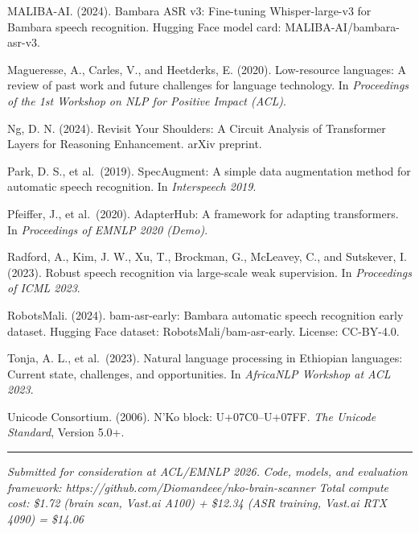 \documentclass[
]{article}
\begin{document}
MALIBA-AI. (2024). Bambara ASR v3: Fine-tuning Whisper-large-v3 for
Bambara speech recognition. Hugging Face model card:
MALIBA-AI/bambara-asr-v3.

Magueresse, A., Carles, V., and Heetderks, E. (2020). Low-resource
languages: A review of past work and future challenges for language
technology. In \emph{Proceedings of the 1st Workshop on NLP for Positive
Impact (ACL)}.

Ng, D. N. (2024). Revisit Your Shoulders: A Circuit Analysis of
Transformer Layers for Reasoning Enhancement. arXiv preprint.

Park, D. S., et al.~(2019). SpecAugment: A simple data augmentation
method for automatic speech recognition. In \emph{Interspeech 2019}.

Pfeiffer, J., et al.~(2020). AdapterHub: A framework for adapting
transformers. In \emph{Proceedings of EMNLP 2020 (Demo)}.

Radford, A., Kim, J. W., Xu, T., Brockman, G., McLeavey, C., and
Sutskever, I. (2023). Robust speech recognition via large-scale weak
supervision. In \emph{Proceedings of ICML 2023}.

RobotsMali. (2024). bam-asr-early: Bambara automatic speech recognition
early dataset. Hugging Face dataset: RobotsMali/bam-asr-early. License:
CC-BY-4.0.

Tonja, A. L., et al.~(2023). Natural language processing in Ethiopian
languages: Current state, challenges, and opportunities. In
\emph{AfricaNLP Workshop at ACL 2023}.

Unicode Consortium. (2006). N'Ko block: U+07C0--U+07FF. \emph{The
Unicode Standard}, Version 5.0+.

\begin{center}\rule{0.5\linewidth}{0.5pt}\end{center}

\emph{Submitted for consideration at ACL/EMNLP 2026.} \emph{Code,
models, and evaluation framework:
https://github.com/Diomandeee/nko-brain-scanner} \emph{Total compute
cost: \$1.72 (brain scan, Vast.ai A100) + \$12.34 (ASR training, Vast.ai
RTX 4090) = \$14.06}
\end{document}
